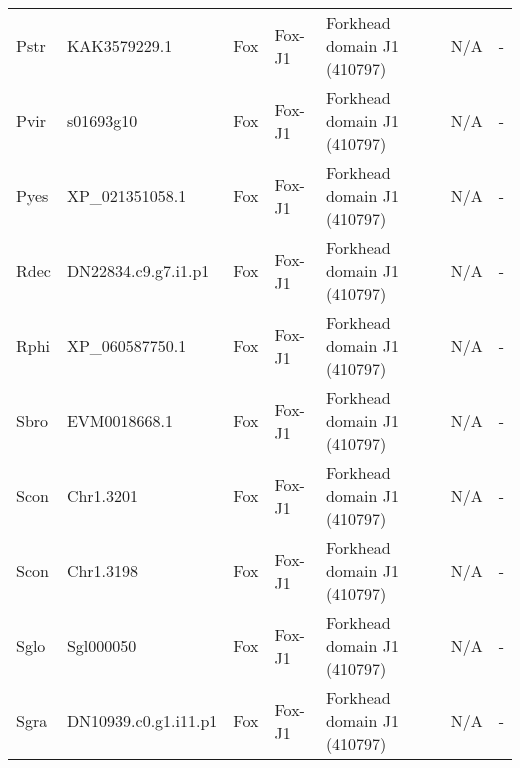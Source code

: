\documentclass[../main.tex]{subfiles}
\begin{document}
\begin{landscape}
\begin{longtable}{lllllll}
		Pstr           & KAK3579229.1          & Fox            & Fox-J1              & Forkhead domain J1 (410797)                 & N/A                                                                    & -                    \\
		Pvir           & s01693g10             & Fox            & Fox-J1              & Forkhead domain J1 (410797)                 & N/A                                                                    & -                    \\
		Pyes           & XP\_021351058.1       & Fox            & Fox-J1              & Forkhead domain J1 (410797)                 & N/A                                                                    & -                    \\
		Rdec           & DN22834.c9.g7.i1.p1   & Fox            & Fox-J1              & Forkhead domain J1 (410797)                 & N/A                                                                    & -                    \\
		Rphi           & XP\_060587750.1       & Fox            & Fox-J1              & Forkhead domain J1 (410797)                 & N/A                                                                    & -                    \\
		Sbro           & EVM0018668.1          & Fox            & Fox-J1              & Forkhead domain J1 (410797)                 & N/A                                                                    & -                    \\
		Scon           & Chr1.3201             & Fox            & Fox-J1              & Forkhead domain J1 (410797)                 & N/A                                                                    & -                    \\
		Scon           & Chr1.3198             & Fox            & Fox-J1              & Forkhead domain J1 (410797)                 & N/A                                                                    & -                    \\
		Sglo           & Sgl000050             & Fox            & Fox-J1              & Forkhead domain J1 (410797)                 & N/A                                                                    & -                    \\
		Sgra           & DN10939.c0.g1.i11.p1  & Fox            & Fox-J1              & Forkhead domain J1 (410797)                 & N/A                                                                    & -                    \\

\end{longtable}
\end{landscape}
\end{document}

